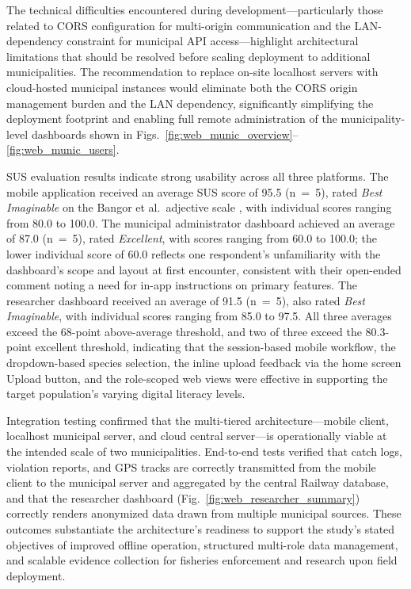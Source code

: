\documentclass[journal]{IEEEtran}
\begin{document}
The technical difficulties encountered during development---particularly those related to
CORS configuration for multi-origin communication and the LAN-dependency constraint for
municipal API access---highlight architectural limitations that should be resolved before
scaling deployment to additional municipalities. The recommendation to replace on-site
localhost servers with cloud-hosted municipal instances would eliminate both the CORS
origin management burden and the LAN dependency, significantly simplifying the deployment
footprint and enabling full remote administration of the municipality-level dashboards
shown in Figs.~\ref{fig:web_munic_overview}--\ref{fig:web_munic_users}.

SUS evaluation results indicate strong usability across all three platforms. The mobile
application received an average SUS score of 95.5 (n~=~5), rated \textit{Best
Imaginable} on the Bangor et al.\ adjective scale \cite{Bangor2008}, with individual
scores ranging from 80.0 to 100.0. The municipal administrator dashboard achieved an
average of 87.0 (n~=~5), rated \textit{Excellent}, with scores ranging from 60.0 to
100.0; the lower individual score of 60.0 reflects one respondent's unfamiliarity with
the dashboard's scope and layout at first encounter, consistent with their open-ended
comment noting a need for in-app instructions on primary features. The researcher
dashboard received an average of 91.5 (n~=~5), also rated \textit{Best Imaginable},
with individual scores ranging from 85.0 to 97.5. All three averages exceed the 68-point
above-average threshold, and two of three exceed the 80.3-point excellent threshold,
indicating that the session-based mobile workflow, the dropdown-based species selection, the inline upload feedback via the home screen
Upload button, and the role-scoped web views were effective in supporting the target
population's varying digital literacy levels.

Integration testing confirmed that the multi-tiered architecture---mobile client,
localhost municipal server, and cloud central server---is operationally viable at the
intended scale of two municipalities. End-to-end tests verified that catch logs,
violation reports, and GPS tracks are correctly transmitted from the mobile client to the
municipal server and aggregated by the central Railway database, and that the researcher
dashboard (Fig.~\ref{fig:web_researcher_summary}) correctly renders anonymized data
drawn from multiple municipal sources. These outcomes substantiate the architecture's
readiness to support the study's stated objectives of improved offline operation,
structured multi-role data management, and scalable evidence collection for fisheries
enforcement and research upon field deployment.
\end{document}
